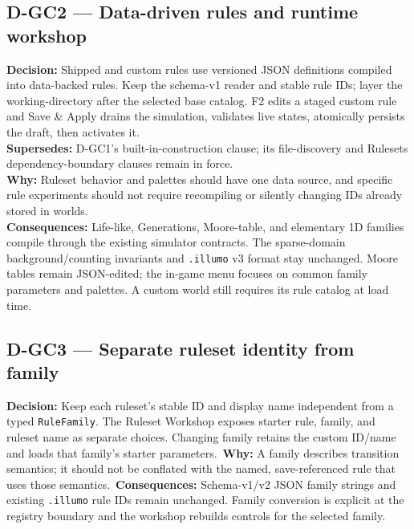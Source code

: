 \subsection*{D-GC2 --- Data-driven rules and runtime workshop}
\begin{decisionbox}[title={D-GC2 \quad 2026-09-15}]
\textbf{Decision:} Shipped and custom rules use versioned JSON definitions
compiled into data-backed rules. Keep the schema-v1 reader and stable rule IDs;
layer the working-directory  after the selected
base catalog. F2 edits a staged custom rule and Save \& Apply drains the
simulation, validates live states, atomically persists the draft, then
activates it.\\
\textbf{Supersedes:} D-GC1's built-in-construction clause; its file-discovery
and Rulesets dependency-boundary clauses remain in force.\\
\textbf{Why:} Ruleset behavior and palettes should have one data source, and
specific rule experiments should not require recompiling or silently changing
IDs already stored in worlds.\\
\textbf{Consequences:} Life-like, Generations, Moore-table, and elementary 1D
families compile through the existing simulator contracts. The sparse-domain
background/counting invariants and \texttt{.illumo} v3 format stay unchanged.
Moore tables remain JSON-edited; the in-game menu focuses on common family
parameters and palettes. A custom world still requires its rule catalog at
load time.
\end{decisionbox}

\subsection*{D-GC3 --- Separate ruleset identity from family}
\begin{decisionbox}[title={D-GC3 \quad 2026-09-15}]
\textbf{Decision:} Keep each ruleset's stable ID and display name independent
from a typed \texttt{RuleFamily}. The Ruleset Workshop exposes starter rule,
family, and ruleset name as separate choices. Changing family retains the
custom ID/name and loads that family's starter parameters.\
\textbf{Why:} A family describes transition semantics; it should not be
conflated with the named, save-referenced rule that uses those semantics.\
\textbf{Consequences:} Schema-v1/v2 JSON family strings and existing
\texttt{.illumo} rule IDs remain unchanged. Family conversion is explicit at
the registry boundary and the workshop rebuilds controls for the selected
family.\
\end{decisionbox}

